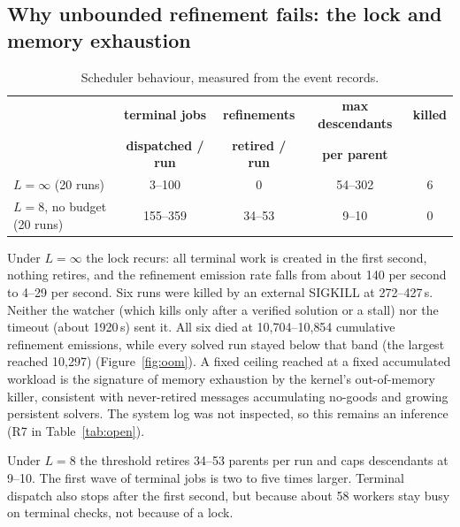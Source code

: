 \documentclass[11pt,a4paper]{article}
\begin{document}
\subsection{Why unbounded refinement fails: the lock and memory exhaustion}\label{sec:oom}

\begin{table}[h]\centering\small
\begin{tabular}{@{}lcccc@{}}
\toprule
 & \textbf{terminal jobs} & \textbf{refinements} & \textbf{max descendants} & \textbf{killed}\\
 & \textbf{dispatched / run} & \textbf{retired / run} & \textbf{per parent} & \\
\midrule
$L=\infty$ (20 runs) & 3--100 & 0 & 54--302 & 6\\
$L=8$, no budget (20 runs) & 155--359 & 34--53 & 9--10 & 0\\
\bottomrule
\end{tabular}
\caption{Scheduler behaviour, measured from the event records.}
\end{table}

Under $L=\infty$ the lock recurs: all terminal work is created in the first second, nothing retires,
and the refinement emission rate falls from about 140 per second to 4--29 per second. Six runs were
killed by an external SIGKILL at 272--427\,s. Neither the watcher (which kills only after a verified
solution or a stall) nor the timeout (about 1920\,s) sent it. All six died at 10{,}704--10{,}854
cumulative refinement emissions, while every solved run stayed below that band (the largest reached
10{,}297) (Figure~\ref{fig:oom}). A fixed ceiling reached at a fixed accumulated workload is the
signature of memory exhaustion by the kernel's out-of-memory killer, consistent with never-retired
messages accumulating no-goods and growing persistent solvers. The system log was not inspected, so
this remains an inference (R7 in Table~\ref{tab:open}).

Under $L=8$ the threshold retires 34--53 parents per run and caps descendants at 9--10. The first
wave of terminal jobs is two to five times larger. Terminal dispatch also stops after the first
second, but because about 58 workers stay busy on terminal checks, not because of a lock.
\end{document}
